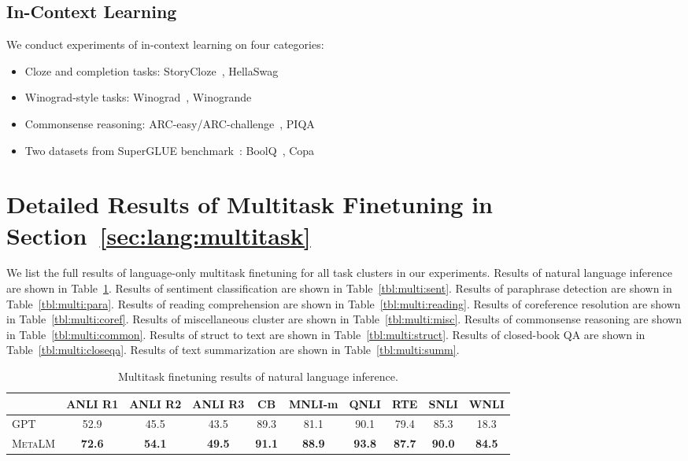 \documentclass{article}
\theoremstyle{plain}
\theoremstyle{definition}
\theoremstyle{remark}
\newcommand\ours{\textsc{MetaLM}}
\begin{document}
\subsection{In-Context Learning}
\label{app:corpora:data:lang:fewshot}
We conduct experiments of in-context learning on four categories:
\begin{itemize}[leftmargin=*]
\item Cloze and completion tasks: StoryCloze~\citep{storycloze}, HellaSwag~\citep{hellaswag}
\item Winograd-style tasks: Winograd~\citep{wsc}, Winogrande~\citep{winogrande}
\item Commonsense reasoning: ARC-easy/ARC-challenge~\citep{arc}, PIQA~\citep{piqa}
\item Two datasets from SuperGLUE benchmark~\citep{superglue}: BoolQ~\citep{boolq}, Copa~\citep{copa}
\end{itemize}


\section{Detailed Results of Multitask Finetuning in Section~\ref{sec:lang:multitask}}
\label{app:results:lang:multitask}

We list the full results of language-only multitask finetuning for all task clusters in our experiments.
Results of natural language inference are shown in Table~\ref{tbl:multi:nli}.
Results of sentiment classification are shown in Table~\ref{tbl:multi:sent}.
Results of paraphrase detection are shown in Table~\ref{tbl:multi:para}.
Results of reading comprehension are shown in Table~\ref{tbl:multi:reading}.
Results of coreference resolution are shown in Table~\ref{tbl:multi:coref}.
Results of miscellaneous cluster are shown in Table~\ref{tbl:multi:misc}.
Results of commonsense reasoning are shown in Table~\ref{tbl:multi:common}.
Results of struct to text are shown in Table~\ref{tbl:multi:struct}.
Results of closed-book QA are shown in Table~\ref{tbl:multi:closeqa}.
Results of text summarization are shown in Table~\ref{tbl:multi:summ}.

\begin{table}[tp!]
\centering
\renewcommand\tabcolsep{3.5pt}
\begin{tabular}{l c c c c c c c c c}
\toprule
 & ANLI R1 & ANLI R2 & ANLI R3 & CB & MNLI-m & QNLI & RTE & SNLI & WNLI  \\
 \midrule
GPT & 52.9 & 45.5 & 43.5 & 89.3 & 81.1 & 90.1 & 79.4 & 85.3 & 18.3 \\
\ours{} & \textbf{72.6}& \textbf{54.1}& \textbf{49.5}& \textbf{91.1}& \textbf{88.9}& \textbf{93.8}& \textbf{87.7}& \textbf{90.0}& \textbf{84.5} \\
\bottomrule
\end{tabular}
\caption{Multitask finetuning results of natural language inference.}
\label{tbl:multi:nli}
\end{table}
\end{document}

